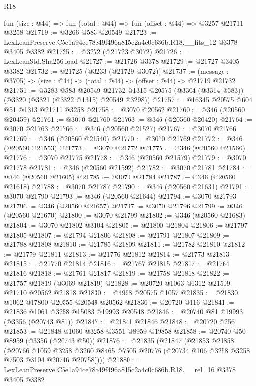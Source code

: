 \begin{lexlean}{R18}
\begin{coremodule}
  fun (size : @44) => fun (total : @44) => fun (offset : @44) => @3257 @21711 @3258
@21719 := @3266 @583 @20549
@21723 := LexLeanPreserve.C5e1a94ce78c49f496a815c2a4c0c686b.R18.__fits_12 @3378 @3405 @3382
@21725 := @3272 (@21723 @3072)
@21726 := LexLeanStd.Sha256.load
@21727 := @21726 @3378
@21729 := @21727 @3405 @3382
@21732 := @21725 (@3233 (@21729 @3072))
@21737 := (message : @3705) -> (size : @44) -> (total : @44) -> (offset : @44) -> @21719 @21732
@21751 := @3283
    @583
    @20549
    @21732
    @1315
    @20575
    (@3304 (@3314 @583))
    (@3320 (@3321 (@3322 @1315) @20549 @3298))
@21757 := @16345 @20575 @604 @51 @1313 @21711 @3258
@21758 := @3070 @20562
@21760 := @346 (@20560 @20459)
@21761 := @3070 @21760
@21763 := @346 (@20560 @20420)
@21764 := @3070 @21763
@21766 := @346 (@20560 @21527)
@21767 := @3070 @21766
@21769 := @346 (@20560 @21540)
@21770 := @3070 @21769
@21772 := @346 (@20560 @21553)
@21773 := @3070 @21772
@21775 := @346 (@20560 @21566)
@21776 := @3070 @21775
@21778 := @346 (@20560 @21579)
@21779 := @3070 @21778
@21781 := @346 (@20560 @21592)
@21782 := @3070 @21781
@21784 := @346 (@20560 @21605)
@21785 := @3070 @21784
@21787 := @346 (@20560 @21618)
@21788 := @3070 @21787
@21790 := @346 (@20560 @21631)
@21791 := @3070 @21790
@21793 := @346 (@20560 @21644)
@21794 := @3070 @21793
@21796 := @346 (@20560 @21657)
@21797 := @3070 @21796
@21799 := @346 (@20560 @21670)
@21800 := @3070 @21799
@21802 := @346 (@20560 @21683)
@21804 := @3070 @21802 @3104
@21805 := @21800 @21804
@21806 := @21797 @21805
@21807 := @21794 @21806
@21808 := @21791 @21807
@21809 := @21788 @21808
@21810 := @21785 @21809
@21811 := @21782 @21810
@21812 := @21779 @21811
@21813 := @21776 @21812
@21814 := @21773 @21813
@21815 := @21770 @21814
@21816 := @21767 @21815
@21817 := @21764 @21816
@21818 := @21761 @21817
@21819 := @21758 @21818
@21822 := @21757 @21819 (@3069 @21819)
@21828 := @20720 @1063 @1312 @21509 @21710 @20562 @21818
@21830 := @4998 @20575 @1057
@21835 := @21830 @1062 @17800 @20555 @20549 @20562
@21836 := @20720 @116
@21841 := @21836 @1061 @3258 @15083 @19993 @20548
@21846 := @20740 @81 @19993 (@3356 (@20743 @81))
@21847 := @21841 @21846
@21848 := @20720 @256
@21853 := @21848 @1060 @3258 @3551 @8959 @19858
@21858 := @20740 @50 @8959 (@3356 (@20743 @50))
@21876 := @21835
    (@21847
      (@21853
        @21858
        (@20766
          @1059
          @3258
          @3260
          @8465
          @7505
          @20776
          (@20734 @106 @3258 @3258 @7503 @3104 @20746 @20758))))
@21880 := LexLeanPreserve.C5e1a94ce78c49f496a815c2a4c0c686b.R18.__rel_16 @3378 @3405 @3382

\end{coremodule}
\end{lexlean}
